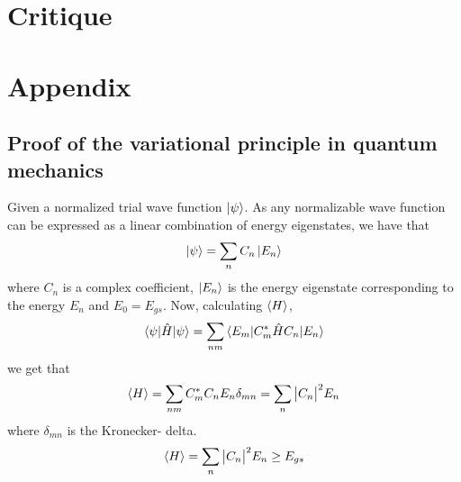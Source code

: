 \documentclass[10pt,a4paper]{article}
\begin{document}
\section{Critique}

\section{Appendix}
\subsection{Proof of the variational principle in quantum mechanics}\label{Proof_variational_principle}
Given a normalized trial wave function $\ket{\psi}$. As any normalizable wave function can be expressed as a linear combination of energy eigenstates, we have that
$$
\ket{\psi} = \sum\limits_n C_n \ket{E_n}
$$
where $C_n$ is a complex coefficient, $\ket{E_n}$ is the energy eigenstate corresponding to the energy $E_n$ and $E_0=E_{gs}$. Now, calculating $\braket{H}$, 
$$
\braket{\psi|\hat{H}|\psi} = \sum\limits_{nm} \braket{E_m|C_m^*\hat{H}C_n|E_n}
$$
we get that 
$$
\braket{H}= \sum\limits_{nm} C_m^*C_n E_n \delta_{mn} =\sum\limits_{n} \big|  C_n \big|^2E_n
$$
where $\delta_{mn}$ is the Kronecker- delta.
\begin{equation}
\braket{H}=\sum\limits_{n} \big|  C_n \big|^2E_n \geq E_{gs}
\end{equation}
\end{document}
